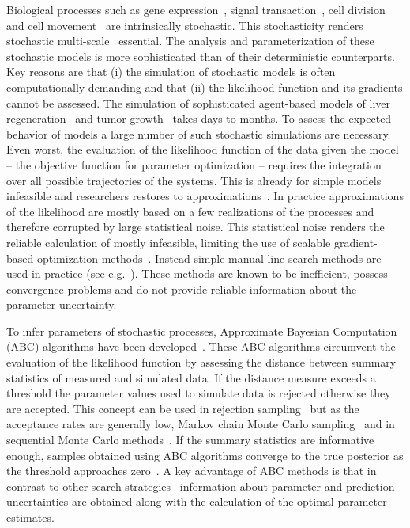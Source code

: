\documentclass[10pt,letterpaper]{article}
\begin{document}
Biological processes such as gene expression~\cite{ElowitzLev2002,EldarElo2010}, signal transaction~\cite{NiepelSpe2009,KlannLap2009}, cell division~\cite{HuhPau2011} and cell movement~\cite{GranerGlazier1992,AndersonQua2008} are intrinsically stochastic. This stochasticity renders stochastic multi-scale~\cite{DadaMen2011,WalpolePap2013,HasenauerJag2015} essential. The analysis and parameterization of these stochastic models is more sophisticated than of their deterministic counterparts. Key reasons are that (i) the simulation of stochastic models is often computationally demanding and that (ii) the likelihood function and its gradients cannot be assessed. The simulation of sophisticated agent-based models of liver regeneration~\cite{HoehmeBru2010} and tumor growth~\cite{AndersonQua2008,Jagiella2012} takes days to months. To assess the expected behavior of models a large number of such stochastic simulations are necessary. Even worst, the evaluation of the likelihood function of the data given the model -- the objective function for parameter optimization -- requires the integration over all possible trajectories of the systems. This is already for simple models infeasible and researchers restores to approximations~\cite{Fuchs2010}. In practice approximations of the likelihood are mostly based on a few realizations of the processes and therefore corrupted by large statistical noise. This statistical noise renders the reliable calculation of mostly infeasible, limiting the use of scalable gradient-based optimization methods~\cite{RaueSch2013}. Instead simple manual line search methods are used in practice (see e.g.~\cite{KarrSan2012,JagiellaMul2015}). These methods are known to be inefficient, possess convergence problems and do not provide reliable information about the parameter uncertainty.

To infer parameters of stochastic processes, Approximate Bayesian Computation (ABC) algorithms have been developed~\cite{BeaumontZha2002}. These ABC algorithms circumvent the evaluation of the likelihood function by assessing the distance between summary statistics of measured and simulated data. If the distance measure exceeds a threshold the parameter values used to simulate data is rejected otherwise they are accepted. This concept can be used in rejection sampling~\cite{BeaumontZha2002} but as the acceptance rates are generally low, Markov chain Monte Carlo sampling~\cite{MarjoramMol2003} and in sequential Monte Carlo methods~\cite{SissonFan2007}. If the summary statistics are informative enough, samples obtained using ABC algorithms converge to the true posterior as the threshold approaches zero~\cite{MarinPil2014}. A key advantage of ABC methods is that in contrast to other search strategies~\cite{AdraKir2011,KarrWil2015} information about parameter and prediction uncertainties are obtained along with the calculation of the optimal parameter estimates.
\end{document}
